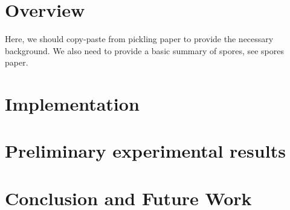 \documentclass{easychair}
\begin{document}
\section{Overview}
\label{sec:overview}




Here, we should copy-paste from pickling paper to provide the necessary background.
We also need to provide a basic summary of spores, see spores paper.


\section{Implementation}


\section{Preliminary experimental results}
\label{sec:experimental}


\section{Conclusion and Future Work}
\label{sec:conclusion}

%
\begin{spacing}{0.9}


\end{spacing}
\end{document}
